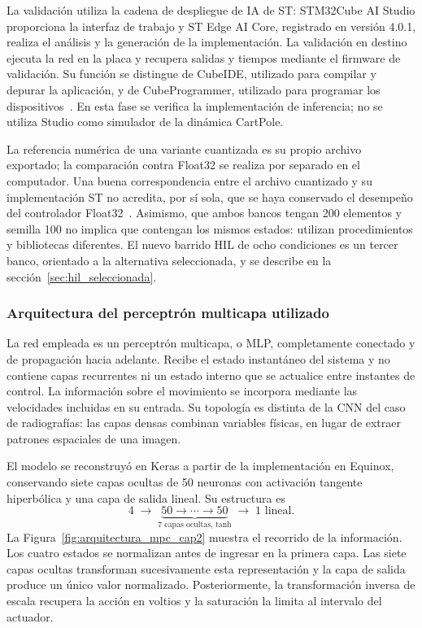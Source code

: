 La validación utiliza la cadena de despliegue de IA de ST: STM32Cube AI Studio proporciona la interfaz de trabajo y ST Edge AI Core, registrado en versión 4.0.1, realiza el análisis y la generación de la implementación. La validación en destino ejecuta la red en la placa y recupera salidas y tiempos mediante el firmware de validación. Su función se distingue de CubeIDE, utilizado para compilar y depurar la aplicación, y de CubeProgrammer, utilizado para programar los dispositivos~\cite{cap5_stvalidacion}. En esta fase se verifica la implementación de inferencia; no se utiliza Studio como simulador de la dinámica CartPole.

La referencia numérica de una variante cuantizada es su propio archivo exportado; la comparación contra Float32 se realiza por separado en el computador. Una buena correspondencia entre el archivo cuantizado y su implementación ST no acredita, por sí sola, que se haya conservado el desempeño del controlador Float32~\cite{cap5_stvalidacion}. Asimismo, que ambos bancos tengan 200 elementos y semilla 100 no implica que contengan los mismos estados: utilizan procedimientos y bibliotecas diferentes. El nuevo barrido HIL de ocho condiciones es un tercer banco, orientado a la alternativa seleccionada, y se describe en la sección~\ref{sec:hil_seleccionada}.

\subsubsection{Arquitectura del perceptrón multicapa utilizado}\label{sec:arquitectura_mpc}
La red empleada es un perceptrón multicapa, o MLP, completamente conectado y de propagación hacia adelante. Recibe el estado instantáneo del sistema y no contiene capas recurrentes ni un estado interno que se actualice entre instantes de control. La información sobre el movimiento se incorpora mediante las velocidades incluidas en su entrada. Su topología es distinta de la CNN del caso de radiografías: las capas densas combinan variables físicas, en lugar de extraer patrones espaciales de una imagen.

El modelo se reconstruyó en Keras a partir de la implementación en Equinox, conservando siete capas ocultas de 50 neuronas con activación tangente hiperbólica y una capa de salida lineal. Su estructura es
\begin{equation}
4\;\longrightarrow\;\underbrace{50\longrightarrow\cdots\longrightarrow50}_{7\text{ capas ocultas, tanh}}\;\longrightarrow\;1\text{ lineal}.
\end{equation}
La Figura~\ref{fig:arquitectura_mpc_cap2} muestra el recorrido de la información. Los cuatro estados se normalizan antes de ingresar en la primera capa. Las siete capas ocultas transforman sucesivamente esta representación y la capa de salida produce un único valor normalizado. Posteriormente, la transformación inversa de escala recupera la acción en voltios y la saturación la limita al intervalo del actuador.

